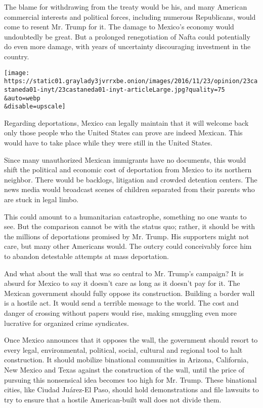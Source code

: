 The blame for withdrawing from the treaty would be his, and many
American commercial interests and political forces, including numerous
Republicans, would come to resent Mr. Trump for it. The damage to
Mexico's economy would undoubtedly be great. But a prolonged
renegotiation of Nafta could potentially do even more damage, with years
of uncertainty discouraging investment in the country.

\texttt{[image: https://static01.graylady3jvrrxbe.onion/images/2016/11/23/opinion/23castaneda01-inyt/23castaneda01-inyt-articleLarge.jpg?quality=75\\\&auto=webp\\\&disable=upscale]}

Regarding deportations, Mexico can legally maintain that it will welcome
back only those people who the United States can prove are indeed
Mexican. This would have to take place while they were still in the
United States.

Since many unauthorized Mexican immigrants have no documents, this would
shift the political and economic cost of deportation from Mexico to its
northern neighbor. There would be backlogs, litigation and crowded
detention centers. The news media would broadcast scenes of children
separated from their parents who are stuck in legal limbo.

This could amount to a humanitarian catastrophe, something no one wants
to see. But the comparison cannot be with the status quo; rather, it
should be with the millions of deportations promised by Mr. Trump. His
supporters might not care, but many other Americans would. The outcry
could conceivably force him to abandon detestable attempts at mass
deportation.

And what about the wall that was so central to Mr. Trump's campaign? It
is absurd for Mexico to say it doesn't care as long as it doesn't pay
for it. The Mexican government should fully oppose its construction.
Building a border wall is a hostile act. It would send a terrible
message to the world. The cost and danger of crossing without papers
would rise, making smuggling even more lucrative for organized crime
syndicates.

Once Mexico announces that it opposes the wall, the government should
resort to every legal, environmental, political, social, cultural and
regional tool to halt construction. It should mobilize binational
communities in Arizona, California, New Mexico and Texas against the
construction of the wall, until the price of pursuing this nonsensical
idea becomes too high for Mr. Trump. These binational cities, like
Ciudad Juárez-El Paso, should hold demonstrations and file lawsuits to
try to ensure that a hostile American-built wall does not divide them.

